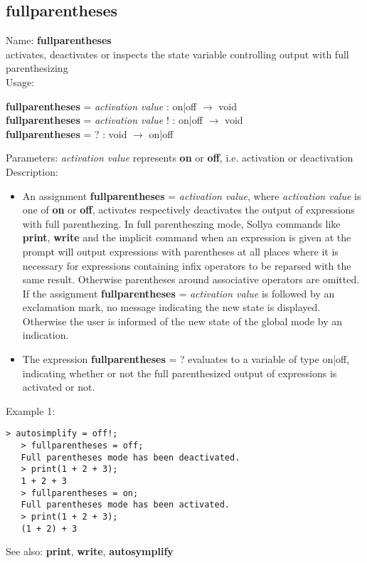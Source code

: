 \subsection{ fullparentheses }
\noindent Name: \textbf{fullparentheses}\\
activates, deactivates or inspects the state variable controlling output with full parenthesizing\\

\noindent Usage: 
\begin{center}
\textbf{fullparentheses} = \emph{activation value} : \textsf{on|off} $\rightarrow$ \textsf{void}\\
\textbf{fullparentheses} = \emph{activation value} ! : \textsf{on|off} $\rightarrow$ \textsf{void}\\
\textbf{fullparentheses} = ? : \textsf{void} $\rightarrow$ \textsf{on|off}\\
\end{center}
Parameters: 
\emph{activation value} represents \textbf{on} or \textbf{off}, i.e. activation or deactivation\\

\noindent Description: \begin{itemize}

\item An assignment \textbf{fullparentheses} = \emph{activation value}, where \emph{activation value}
   is one of \textbf{on} or \textbf{off}, activates respectively deactivates the output
   of expressions with full parenthezing. In full parentheszing mode,
   Sollya commands like \textbf{print}, \textbf{write} and the implicit command when an
   expression is given at the prompt will output expressions with
   parentheses at all places where it is necessary for expressions
   containing infix operators to be reparsed with the same
   result. Otherwise parentheses around associative operators are
   omitted.
   If the assignment \textbf{fullparentheses} = \emph{activation value} is followed by an
   exclamation mark, no message indicating the new state is
   displayed. Otherwise the user is informed of the new state of the
   global mode by an indication.

\item The expression \textbf{fullparentheses} = ? evaluates to a variable of type
   \textsf{on|off}, indicating whether or not the full parenthesized output
   of expressions is activated or not.
\end{itemize}
\noindent Example 1: 
\begin{center}\begin{minipage}{14.8cm}\begin{Verbatim}[frame=single]
   > autosimplify = off!;
   > fullparentheses = off;
   Full parentheses mode has been deactivated.
   > print(1 + 2 + 3);
   1 + 2 + 3
   > fullparentheses = on;
   Full parentheses mode has been activated.
   > print(1 + 2 + 3);
   (1 + 2) + 3
\end{Verbatim}
\end{minipage}\end{center}
See also: \textbf{print}, \textbf{write}, \textbf{autosymplify}
